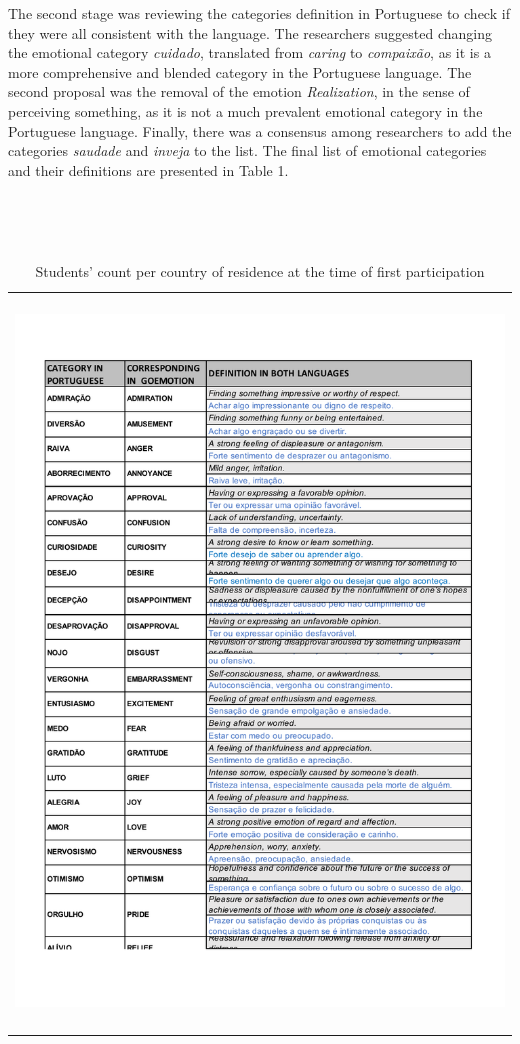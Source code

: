 \documentclass[12pt]{article}
\begin{document}
The second stage was reviewing the categories definition in Portuguese to check if they were all consistent with the language. The researchers suggested changing the emotional category \textit{cuidado}, translated from \textit{caring} to \textit{compaixão}, as it is a more comprehensive and blended category in the Portuguese language. The second proposal was the removal of the emotion \textit{Realization}, in the sense of perceiving something, as it is not a much prevalent emotional category in the Portuguese language. Finally, there was a consensus among researchers to add the categories \textit{saudade} and \textit{inveja} to the list. The final list of emotional categories and their definitions are presented in Table 1.

\begin{table}
  \caption{Students' count per country of residence at the time of first participation}
  \label{tab:sts_by_countries}
  \begin{tabularx}{\textwidth}{X}
    \includegraphics[trim=0cm 6.5cm 1cm 1.3cm, clip, width=\textwidth]{img-n-tables/EMOCOES}
  \end{tabularx}
\end{table}
\end{document}
